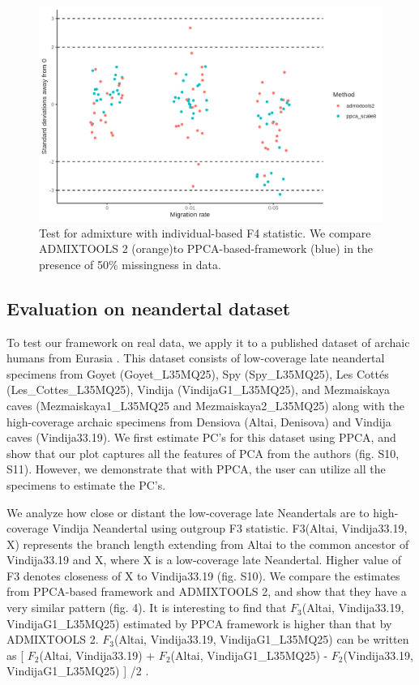 \documentclass[12pt, letterpaper]{article}
\begin{document}
\begin{figure}[ht!]
    \includegraphics[width=16.5cm]{plots/simfiles/AvgFolder/Ne1000/split_times1000/npop10_nind100/missing0.5/plots_8/hypothesis_test_comparison.png}
    \centering
    \caption{Test for admixture with individual-based F4 statistic. We compare ADMIXTOOLS 2 (orange)to PPCA-based-framework (blue) in the presence of 50\% missingness in data.}
    \label{figS2:pc_scale}
\end{figure}



\subsection{Evaluation on neandertal dataset}

To test our framework on real data, we apply it to a published dataset of archaic humans from Eurasia \cite{hajdinjak}. This dataset consists of low-coverage late neandertal specimens from Goyet (Goyet\_L35MQ25), Spy (Spy\_L35MQ25), Les Cottés (Les\_Cottes\_L35MQ25), Vindija (VindijaG1\_L35MQ25), and Mezmaiskaya caves (Mezmaiskaya1\_L35MQ25 and Mezmaiskaya2\_L35MQ25) along with the high-coverage archaic specimens from Densiova (Altai, Denisova) and Vindija caves (Vindija33.19). We first estimate PC's for this dataset using PPCA, and show that our plot captures all the features of PCA from the authors (fig. S10, S11). However, we demonstrate that with PPCA, the user can utilize all the specimens to estimate the PC's. 

We analyze how close or distant the low-coverage late Neandertals are to high-coverage Vindija Neandertal using outgroup F3 statistic. F3(Altai, Vindija33.19, X) represents the branch length extending from Altai to the common ancestor of Vindija33.19 and X, where X is a low-coverage late Neandertal. Higher value of F3 denotes closeness of X to Vindija33.19 (fig. S10). We compare the estimates from PPCA-based framework and ADMIXTOOLS 2, and show that they have a very similar pattern (fig. 4). It is interesting to find that $F_3$(Altai, Vindija33.19, VindijaG1\_L35MQ25) estimated by PPCA framework is higher than that by ADMIXTOOLS 2. $F_3$(Altai, Vindija33.19, VindijaG1\_L35MQ25) can be written as [ $F_2$(Altai, Vindija33.19) + $F_2$(Altai, VindijaG1\_L35MQ25) - $F_2$(Vindija33.19, VindijaG1\_L35MQ25) ] /2 .
\end{document}
